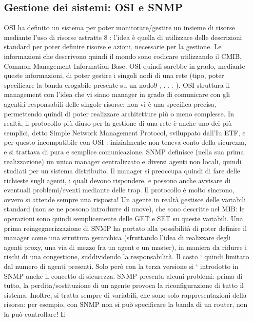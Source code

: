 \subsection{Gestione dei sistemi: OSI e SNMP}
OSI ha definito un sistema per poter monitorare/gestire un insieme di risorse
mediante l'uso di risorse astratte 8 : l'idea è quella di utilizzare delle descrizioni
standard per poter definire risorse e azioni, necessarie per la gestione. Le informazioni che descrivono quindi il mondo
sono codicare utilizzando il CMIB,
Common Management Information Base. OSI quindi sarebbe in grado, mediante queste informazioni, di poter gestire i
singoli nodi di una rete (tipo, poter
specificare la banda erogabile presente su un nodo9 , . . . ). OSI struttura il management con l'idea che vi siano manager
in grado di comunicare con gli agenti,i
responsabili delle singole risorse: non vi è una specifica precisa, permettendo
quindi di poter realizzare architetture più o meno complesse.
In realtà, il protocollo più diuso per la gestione di una rete è anche uno
dei più semplici, detto Simple Network Management Protocol, sviluppato dall'Iu
ETF, e per questo incompatibile con OSI : inizialmente non teneva conto della
sicurezza, e si trattava di pura e semplice comunicazione.
SNMP definisce (nella sua prima realizzazione) un unico manager centralizzato e diversi agenti non locali, quindi studiati
per un sistema distribuito. Il
manager si preoccupa quindi di fare delle richieste sugli agenti, i quali devono
rispondere, e possono anche avvisare di eventuali problemi/eventi mediante delle
trap. Il protocollo è molto sincrono, ovvero si attende sempre una risposta!
Un agente in realtà gestisce delle variabili standard (non se ne possono
introdurre di nuove), che sono descritte nel MIB: le operazioni sono quindi
semplicemente delle GET e SET su queste variabili.
Una prima reingegnerizzazione di SNMP ha portato alla possibilità di poter
definire il manager come una struttura gerarchica (sfruttando l'idea di realizzare
degli agenti proxy, una via di mezzo fra un agent e un master), in maniera da
ridurre i rischi di una congestione, suddividendo la responsabilità. Il costo `
quindi limitato dal numero di agenti presenti. Solo però con la terza versione si
` introdotto in SNMP anche il concetto di sicurezza.
SNMP presenta alcuni problemi: prima di tutto, la perdita/sostituzione di
un agente provoca la riconfigurazione di tutto il sistema. Inoltre, si tratta sempre di variabili, che sono solo
rappresentazioni della risorsa: per esempio, con
SNMP non si può specificare la banda di un router, non la può controllare! Il

